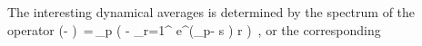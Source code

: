 The interesting dynamical averages is determined by the spectrum of the operator
\beq \det(\eigenvL - \Lop) \,=\,\prod_{p} \exp \left(
  - { \sum_{r=1}^ { e^{(\beta \cdot \hn_p- s
        ) r} \over {} }
  } \right) \,,
or the corresponding \dzeta\
